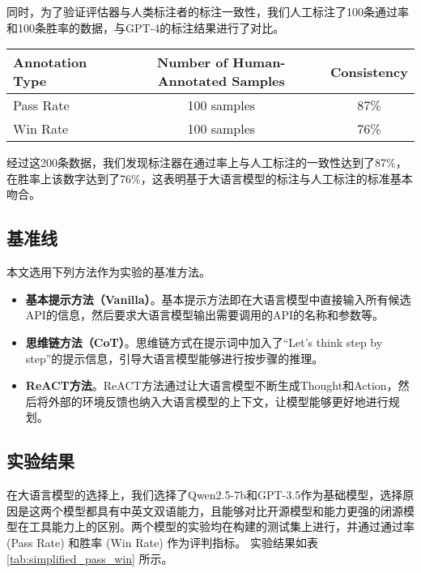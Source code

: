同时，为了验证评估器与人类标注者的标注一致性，我们人工标注了100条通过率和100条胜率的数据，与GPT-4的标注结果进行了对比。

\begin{table}[h]
  \centering
  \label{tab:consistency}
  \begin{tabular}{l|c|c}
  \toprule
  \textbf{Annotation Type} & \textbf{Number of Human-Annotated Samples} & \textbf{Consistency} \\ \midrule
  Pass Rate                & 100 samples                                & 87\%                 \\
  Win Rate                 & 100 samples                                & 76\%                 \\ 
  \bottomrule
  \end{tabular}
\end{table}
  
  \noindent

经过这200条数据，我们发现标注器在通过率上与人工标注的一致性达到了87\%，在胜率上该数字达到了76\%，这表明基于大语言模型的标注与人工标注的标准基本吻合。

\subsection{基准线}

本文选用下列方法作为实验的基准方法。

\begin{itemize}
  \item  \textbf{基本提示方法（Vanilla）}。基本提示方法即在大语言模型中直接输入所有候选API的信息，然后要求大语言模型输出需要调用的API的名称和参数等。
  \item  \textbf{思维链方法（CoT）}\cite{Wang2023a}。思维链方式在提示词中加入了“Let's think step by step”的提示信息，引导大语言模型能够进行按步骤的推理。
  \item  \textbf{ReACT方法}\cite{Yao2023b}。ReACT方法通过让大语言模型不断生成Thought和Action，然后将外部的环境反馈也纳入大语言模型的上下文，让模型能够更好地进行规划。
\end{itemize}
\indent

\subsection{实验结果}

在大语言模型的选择上，我们选择了Qwen2.5-7b和GPT-3.5作为基础模型，选择原因是这两个模型都具有中英文双语能力，且能够对比开源模型和能力更强的闭源模型在工具能力上的区别。两个模型的实验均在构建的测试集上进行，并通过通过率 (Pass Rate) 和胜率 (Win Rate) 作为评判指标。
实验结果如表 \ref{tab:simplified_pass_win} 所示。

